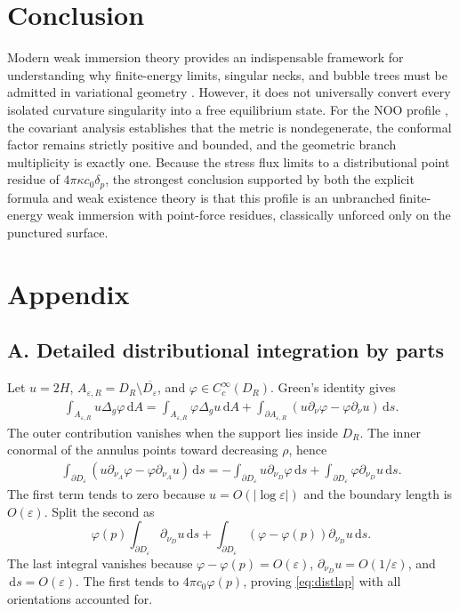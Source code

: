 \documentclass[preprint,amsmath,amssymb,aps,prl,superscriptaddress,nofootinbib,floatfix]{revtex4-2}
\newcommand{\dd}{\,\mathrm d}
\begin{document}
\section{Conclusion}\label{sec:conclusion}
Modern weak immersion theory provides an indispensable framework for understanding why finite-energy limits, singular necks, and bubble trees must be admitted in variational geometry \cite{MondinoScharrer2020}. However, it does not universally convert every isolated curvature singularity into a free equilibrium state. For the NOO profile \cite{Naito1993,Naito1996}, the covariant analysis establishes that the metric is nondegenerate, the conformal factor remains strictly positive and bounded, and the geometric branch multiplicity is exactly one. Because the stress flux limits to a distributional point residue of \(4\pi\kappa c_0\delta_p\), the strongest conclusion supported by both the explicit formula and weak existence theory is that this profile is an unbranched finite-energy weak immersion with point-force residues, classically unforced only on the punctured surface.

\appendix
\section*{Appendix}
\subsection*{A. Detailed distributional integration by parts}
Let \(u=2H\), \(A_{\varepsilon,R}=D_R\setminus\overline{D_\varepsilon}\), and \(\varphi\in C_c^\infty(D_R)\). Green's identity gives
\begin{align}
\int_{A_{\varepsilon,R}}u\Delta_g\varphi\dd A
=\int_{A_{\varepsilon,R}}\varphi\Delta_g u\dd A+\int_{\partial A_{\varepsilon,R}}(u\partial_\nu\varphi-\varphi\partial_\nu u)\dd s.
\end{align}
The outer contribution vanishes when the support lies inside \(D_R\). The inner conormal of the annulus points toward decreasing \(\rho\), hence
\begin{align*}
\int_{\partial D_\varepsilon}(u\partial_{\nu_A}\varphi-\varphi\partial_{\nu_A}u)\dd s
=-\int_{\partial D_\varepsilon}u\partial_{\nu_D}\varphi\dd s+\int_{\partial D_\varepsilon}\varphi\partial_{\nu_D}u\dd s.
\end{align*}
The first term tends to zero because \(u=O(|\log\varepsilon|)\) and the boundary length is \(O(\varepsilon)\). Split the second as
\[
\varphi(p)\int_{\partial D_\varepsilon}\partial_{\nu_D}u\dd s+\int_{\partial D_\varepsilon}(\varphi-\varphi(p))\partial_{\nu_D}u\dd s.
\]
The last integral vanishes because \(\varphi-\varphi(p)=O(\varepsilon)\), \(\partial_{\nu_D}u=O(1/\varepsilon)\), and \(\dd s=O(\varepsilon)\). The first tends to \(4\pi c_0\varphi(p)\), proving \eqref{eq:distlap} with all orientations accounted for.
\end{document}

